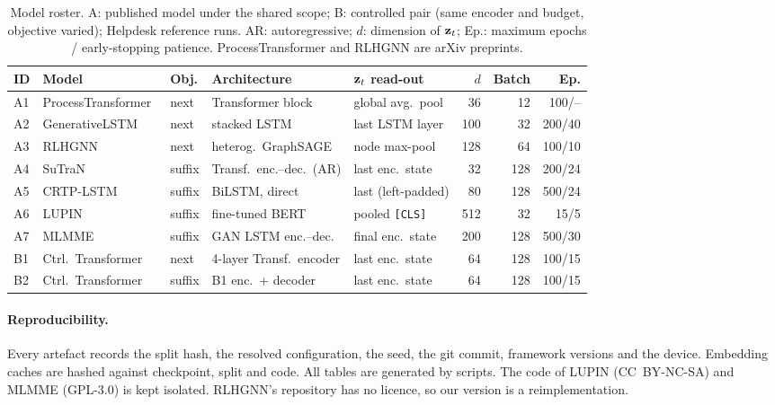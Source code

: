 \begin{table}[t]
\centering
\caption{Model roster. A: published model under the shared scope; B:
controlled pair (same encoder and budget, objective varied); Helpdesk reference runs. AR:
autoregressive; $d$: dimension of $\mathbf{z}_t$; Ep.: maximum epochs / early-stopping
patience. ProcessTransformer and RLHGNN are arXiv preprints.}
\label{tab:roster}
\scriptsize
\setlength{\tabcolsep}{2.6pt}
\begin{tabular}{@{}lllllrrr@{}}
\toprule
ID & Model & Obj. & Architecture & $\mathbf{z}_t$ read-out & $d$ & Batch & Ep. \\
\midrule
A1 & ProcessTransformer~\cite{bukhsh2021processtransformer} & next & Transformer block & global avg.\ pool & 36 & 12 & 100/-- \\
A2 & GenerativeLSTM~\cite{camargo2019lstm} & next & stacked LSTM & last LSTM layer & 100 & 32 & 200/40 \\
A3 & RLHGNN~\cite{wang2025rlhgnn} & next & heterog.\ GraphSAGE & node max-pool & 128 & 64 & 100/10 \\
\midrule
A4 & SuTraN~\cite{wuyts2024sutran} & suffix & Transf.\ enc.--dec.\ (AR) & last enc.~state & 32 & 128 & 200/24 \\
A5 & CRTP-LSTM~\cite{gunnarsson2023crtp} & suffix & BiLSTM, direct & last (left-padded) & 80 & 128 & 500/24 \\
A6 & LUPIN~\cite{pasquadibisceglie2024lupin} & suffix & fine-tuned BERT & pooled \texttt{[CLS]} & 512 & 32 & 15/5 \\
A7 & MLMME~\cite{taymouri2021mlmme} & suffix & GAN LSTM enc.--dec. & final enc.~state & 200 & 128 & 500/30 \\
\midrule
B1 & Ctrl.\ Transformer & next & 4-layer Transf.\ encoder & last enc.~state & 64 & 128 & 100/15 \\
B2 & Ctrl.\ Transformer & suffix & B1 enc.~+ decoder & last enc.~state & 64 & 128 & 100/15 \\
\bottomrule
\end{tabular}
\end{table}

\paragraph{Reproducibility.}
Every artefact records the split hash, the resolved configuration, the seed,
the git commit, framework versions and the device. Embedding caches are
hashed against checkpoint, split and code. All tables are generated by
scripts. The code of LUPIN (CC~BY-NC-SA) and MLMME (GPL-3.0) is kept isolated.
RLHGNN's repository has no licence, so our version is a reimplementation.
